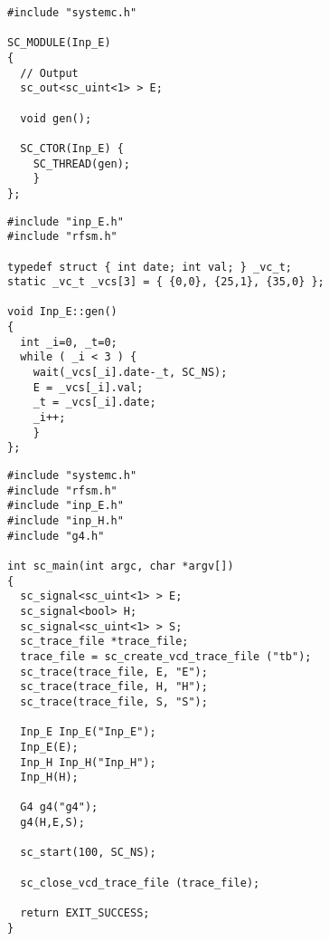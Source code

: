 \begin{lstlisting}[language=systemc,frame=single,numbers=none,basicstyle=\small,caption=File inp_E.h]
#include "systemc.h"

SC_MODULE(Inp_E)
{
  // Output
  sc_out<sc_uint<1> > E;

  void gen();

  SC_CTOR(Inp_E) {
    SC_THREAD(gen);
    }
};
\end{lstlisting}

\begin{lstlisting}[language=systemc,frame=single,numbers=none,basicstyle=\small,caption=File inp_E.cpp]
#include "inp_E.h"
#include "rfsm.h"

typedef struct { int date; int val; } _vc_t;
static _vc_t _vcs[3] = { {0,0}, {25,1}, {35,0} };

void Inp_E::gen()
{
  int _i=0, _t=0;
  while ( _i < 3 ) {
    wait(_vcs[_i].date-_t, SC_NS);
    E = _vcs[_i].val;
    _t = _vcs[_i].date;
    _i++;
    }
};
\end{lstlisting}

\begin{lstlisting}[language=systemc,frame=single,numbers=none,basicstyle=\small,caption=File tb.cpp]
#include "systemc.h"
#include "rfsm.h"
#include "inp_E.h"
#include "inp_H.h"
#include "g4.h"

int sc_main(int argc, char *argv[])
{
  sc_signal<sc_uint<1> > E;
  sc_signal<bool> H;
  sc_signal<sc_uint<1> > S;
  sc_trace_file *trace_file;
  trace_file = sc_create_vcd_trace_file ("tb");
  sc_trace(trace_file, E, "E");
  sc_trace(trace_file, H, "H");
  sc_trace(trace_file, S, "S");

  Inp_E Inp_E("Inp_E");
  Inp_E(E);
  Inp_H Inp_H("Inp_H");
  Inp_H(H);

  G4 g4("g4");
  g4(H,E,S);

  sc_start(100, SC_NS);

  sc_close_vcd_trace_file (trace_file);

  return EXIT_SUCCESS;
}
\end{lstlisting}


